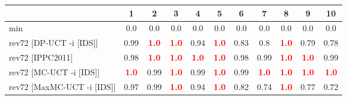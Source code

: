 \documentclass{article}
\begin{document}
\begin{tabular}{|l|r@{$\pm$}rr@{$\pm$}rr@{$\pm$}rr@{$\pm$}rr@{$\pm$}rr@{$\pm$}rr@{$\pm$}rr@{$\pm$}rr@{$\pm$}rr@{$\pm$}r|}
\hline

& \multicolumn{2}{c}{1}
& \multicolumn{2}{c}{2}
& \multicolumn{2}{c}{3}
& \multicolumn{2}{c}{4}
& \multicolumn{2}{c}{5}
& \multicolumn{2}{c}{6}
& \multicolumn{2}{c}{7}
& \multicolumn{2}{c}{8}
& \multicolumn{2}{c}{9}
& \multicolumn{2}{c|}{10}
\\
\hline
\hline
min
& \multicolumn{2}{c}{0.0}
& \multicolumn{2}{c}{0.0}
& \multicolumn{2}{c}{0.0}
& \multicolumn{2}{c}{0.0}
& \multicolumn{2}{c}{0.0}
& \multicolumn{2}{c}{0.0}
& \multicolumn{2}{c}{0.0}
& \multicolumn{2}{c}{0.0}
& \multicolumn{2}{c}{0.0}
& \multicolumn{2}{c|}{0.0}
\\
rev72 [DP-UCT -i [IDS]]
& \multicolumn{2}{c}{0.99}
& \multicolumn{2}{c}{\textbf{\textcolor{red}{1.0}}}
& \multicolumn{2}{c}{\textbf{\textcolor{red}{1.0}}}
& \multicolumn{2}{c}{0.94}
& \multicolumn{2}{c}{\textbf{\textcolor{red}{1.0}}}
& \multicolumn{2}{c}{0.83}
& \multicolumn{2}{c}{0.8}
& \multicolumn{2}{c}{\textbf{\textcolor{red}{1.0}}}
& \multicolumn{2}{c}{0.79}
& \multicolumn{2}{c|}{0.78}
\\
rev72 [IPPC2011]
& \multicolumn{2}{c}{0.98}
& \multicolumn{2}{c}{\textbf{\textcolor{red}{1.0}}}
& \multicolumn{2}{c}{\textbf{\textcolor{red}{1.0}}}
& \multicolumn{2}{c}{\textbf{\textcolor{red}{1.0}}}
& \multicolumn{2}{c}{\textbf{\textcolor{red}{1.0}}}
& \multicolumn{2}{c}{0.98}
& \multicolumn{2}{c}{0.99}
& \multicolumn{2}{c}{\textbf{\textcolor{red}{1.0}}}
& \multicolumn{2}{c}{\textbf{\textcolor{red}{1.0}}}
& \multicolumn{2}{c|}{0.99}
\\
rev72 [MC-UCT -i [IDS]]
& \multicolumn{2}{c}{\textbf{\textcolor{red}{1.0}}}
& \multicolumn{2}{c}{0.99}
& \multicolumn{2}{c}{\textbf{\textcolor{red}{1.0}}}
& \multicolumn{2}{c}{0.99}
& \multicolumn{2}{c}{\textbf{\textcolor{red}{1.0}}}
& \multicolumn{2}{c}{0.99}
& \multicolumn{2}{c}{\textbf{\textcolor{red}{1.0}}}
& \multicolumn{2}{c}{\textbf{\textcolor{red}{1.0}}}
& \multicolumn{2}{c}{\textbf{\textcolor{red}{1.0}}}
& \multicolumn{2}{c|}{\textbf{\textcolor{red}{1.0}}}
\\
rev72 [MaxMC-UCT -i [IDS]]
& \multicolumn{2}{c}{0.97}
& \multicolumn{2}{c}{0.99}
& \multicolumn{2}{c}{\textbf{\textcolor{red}{1.0}}}
& \multicolumn{2}{c}{0.94}
& \multicolumn{2}{c}{\textbf{\textcolor{red}{1.0}}}
& \multicolumn{2}{c}{0.82}
& \multicolumn{2}{c}{0.74}
& \multicolumn{2}{c}{\textbf{\textcolor{red}{1.0}}}
& \multicolumn{2}{c}{0.77}
& \multicolumn{2}{c|}{0.72}

\end{tabular}
\end{document}
